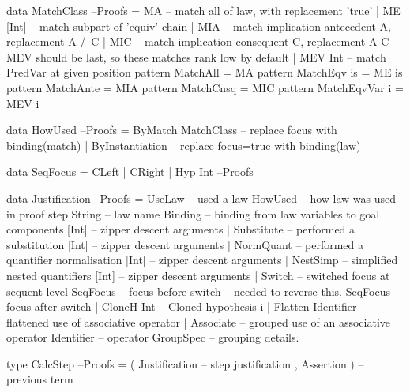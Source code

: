 \begin{code}
data MatchClass                                                       --Proofs
  = MA       -- match all of law, with replacement 'true'
  | ME [Int] -- match subpart of 'equiv' chain
  | MIA      -- match implication antecedent A, replacement A /\ C
  | MIC      -- match implication consequent C, replacement A \/ C
  -- MEV should be last, so these matches rank low by default
  | MEV Int  -- match PredVar at given position
pattern MatchAll       = MA
pattern MatchEqv is    = ME is
pattern MatchAnte      = MIA
pattern MatchCnsq      = MIC
pattern MatchEqvVar i  = MEV i
\end{code}

\begin{code}
data HowUsed                                                          --Proofs
  = ByMatch MatchClass  -- replace focus with binding(match)
  | ByInstantiation     -- replace focus=true with binding(law)
\end{code}

\begin{code}
data SeqFocus = CLeft | CRight | Hyp Int                              --Proofs
\end{code}

\begin{code}
data Justification                                                    --Proofs
  = UseLaw             -- used a law
      HowUsed              -- how law was used in proof step
      String               -- law name
      Binding              -- binding from law variables to goal components
      [Int]                -- zipper descent arguments
  | Substitute         -- performed a substitution
      [Int]                -- zipper descent arguments
  | NormQuant          -- performed a quantifier normalisation
      [Int]                -- zipper descent arguments
  | NestSimp           -- simplified nested quantifiers
      [Int]                -- zipper descent arguments
  | Switch             -- switched focus at sequent level
      SeqFocus             -- focus before switch -- needed to reverse this.
      SeqFocus             -- focus after switch
  | CloneH Int         --  Cloned hypothesis i
  | Flatten Identifier -- flattened use of associative operator
  | Associate          -- grouped use of an associative operator
      Identifier           -- operator
      GroupSpec            -- grouping details.
\end{code}

\begin{code}
type CalcStep                                                         --Proofs
  = ( Justification  -- step justification
    , Assertion )         -- previous term
\end{code}

